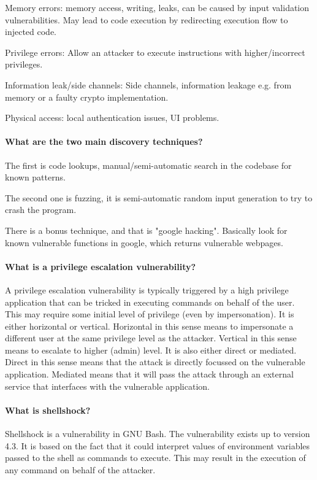 Memory errors: memory access, writing, leaks, can be caused by input validation vulnerabilities. May lead to code execution by redirecting execution flow to injected code.

Privilege errors: Allow an attacker to execute instructions with higher/incorrect privileges.

Information leak/side channels: Side channels, information leakage e.g. from memory or a faulty crypto implementation.

Physical access: local authentication issues, UI problems.

\paragraph{What are the two main discovery techniques?}
The first is code lookups, manual/semi-automatic search in the codebase for known patterns.

The second one is fuzzing, it is semi-automatic random input generation to try to crash the program.

There is a bonus technique, and that is "google hacking". Basically look for known vulnerable functions in google, which returns vulnerable webpages.

\paragraph{What is a privilege escalation vulnerability?}
A privilege escalation vulnerability is typically triggered by a high privilege application that can be tricked in executing commands on behalf of the user. This may require some initial level of privilege (even by impersonation). It is either horizontal or vertical. Horizontal in this sense means to impersonate a different user at the same privilege level as the attacker. Vertical in this sense means to escalate to higher (admin) level. It is also either direct or mediated. Direct in this sense means that the attack is directly focussed on the vulnerable application. Mediated means that it will pass the attack through an external service that interfaces with the vulnerable application.

\paragraph{What is shellshock?}
Shellshock is a vulnerability in GNU Bash. The vulnerability exists up to version 4.3. It is based on the fact that it could interpret values of environment variables passed to the shell as commands to execute. This may result in the execution of any command on behalf of the attacker.

